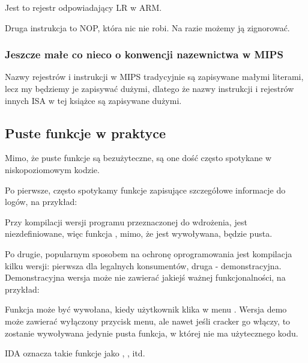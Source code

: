 Jest to rejestr odpowiadający \ac{LR} w ARM.

Druga instrukcja to \ac{NOP}, która nic nie robi.
Na razie możemy ją zignorować.

\subsubsection{Jeszcze małe co nieco o konwencji nazewnictwa w MIPS}
Nazwy rejestrów i instrukcji w MIPS tradycyjnie są zapisywane małymi literami,
lecz my będziemy je zapisywać dużymi, dlatego że nazwy instrukcji i rejestrów innych
\ac{ISA} w tej książce są zapisywane dużymi.

\subsection{Puste funkcje w praktyce}

Mimo, że puste funkcje są bezużyteczne, są one dość często spotykane w niskopoziomowym kodzie.

Po pierwsze, często spotykamy funkcje zapisujące szczegółowe informacje do logów, na przykład:



Przy kompilacji wersji programu przeznaczonej do wdrożenia,  jest niezdefiniowane,
więc funkcja , mimo, że jest wywoływana, będzie pusta.

Po drugie, popularnym sposobem na ochronę oprogramowania jest kompilacja kilku wersji: pierwsza dla legalnych konsumentów, druga - demonstracyjna.
Demonstracyjna wersja może nie zawierać jakiejś ważnej funkcjonalności, na przykład:



Funkcja  może być wywołana, kiedy użytkownik klika w menu .
Wersja demo może zawierać wyłączony przycisk menu, ale nawet jeśli cracker go włączy,
to zostanie wywoływana jedynie pusta funkcja, w której nie ma użytecznego kodu.

IDA oznacza takie funkcje jako , , itd.

